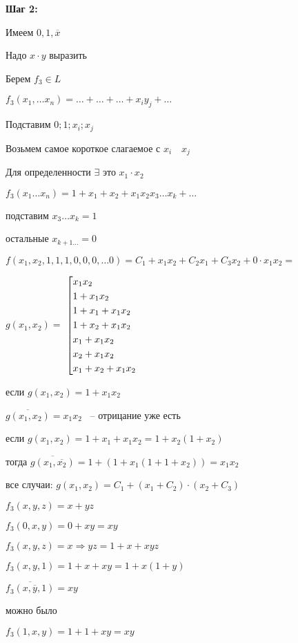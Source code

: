 \documentclass[russian]{lecture-notes}
\begin{document}
	\textbf{Шаг 2:}
	
	Имеем $0, 1, \overline{x}$
	
	Надо $x \cdot y$ выразить
	
	Берем $f_3 \in L$
	
	$f_3(x_1, \dots x_n) = \dots + \dots + \dots + x_iy_j + \dots$
	
	Подставим $0; 1; x_i; x_j$
	
	Возьмем самое короткое слагаемое с $x_i \quad x_j$
	
	Для определенности $\exists$ это $x_1 \cdot x_2$ 
	
	$f_3(x_1 \dots x_n) = 1 + x_1 + x_2 + x_1x_2x_3\dots x_k + \dots$
	
	подставим $x_3 \dots x_k = 1$
	
	остальные $x_{k+1 \dots} = 0$
	
	$f(x_1, x_2, 1, 1, 1, 0, 0, 0, \dots 0) = C_1 + x_1x_2 + C_2x_1 + C_3x_2 + 0 \cdot x_1x_2 = $	
	
	$g(x_1, x_2) = $
	$\left[ 
  		\begin{gathered} 
    			x_1 x_2 \hfill 
        \\ 
        		1 + x_1 x_2 \hfill 
        \\ 
        		1 + x_1 + x_1 x_2 \hfill 
        \\ 
        		1 + x_2 +  x_1 x_2 \hfill 
        \\ 	  	
        		x_1 +  x_1 x_2 \hfill 
        \\ 	  	
        		x_2 +  x_1 x_2 \hfill 
        \\ 	  		  	
        		x_1 + x_2 +  x_1 x_2 \hfill 
        \\ 	  		  	
	  	\end{gathered} 
	\right.$
	
	
	если $g(x_1, x_2) = 1 + x_1 x_2$
	
	$\overline{g(x_1, x_2)} = x_1 x_2$ ~-- отрицание уже есть
	
	если $g(x_1, x_2) = 1 + x_1 + x_1 x_2 = 1 + x_2(1 + x_2)$
	
	тогда $\overline{g(x_1, \overline{x_2})} = 1 + (1 + x_1(1 + 1 + x_2)) = x_1 x_2$

	все случаи: $g(x_1, x_2) = C_1 + (x_1 + C_2) \cdot (x_2 + C_3)$
	
\begin{example}
	$f_3(x, y, z) = x + yz$
	
	$f_3(0, x, y) = 0 + xy = xy$
\end{example}

\begin{example}
	$f_3(x, y, z) = x \Rightarrow yz = 1 + x + xyz$
	
	$f_3(x, y, 1) = 1 + x + xy = 1 + x(1 + y)$
	
	$\overline{f_3(x, \overline{y}, 1)} = xy$
	
	можно было
	
	$f_3(1, x, y) = 1 + 1 + xy = xy$
\end{example}
\end{document}
